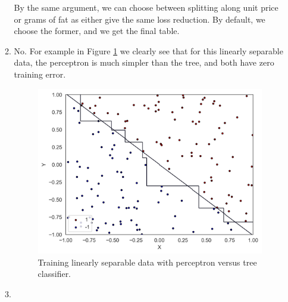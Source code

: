 \documentclass[12pt]{article}
\begin{document}
\begin{enumerate}[leftmargin=*]
\begin{enumerate}[label=\Alph*.]
By the same argument, we can choose between splitting along unit price or grams of fat as either give the same loss reduction. By default, we choose the former, and we get the final table.
\begin{figure}[h!]
\centering
{}
\end{figure}
\item No. For example in Figure \ref{perceptron vs tree} we clearly see that for this linearly separable data, the perceptron is much simpler than the tree, and both have zero training error.
\begin{figure}[h!]
\centering
\includegraphics[scale=0.65]{Set3Figures/random_linear.png}
\caption{Training linearly separable data with perceptron versus tree classifier.} \label{perceptron vs tree}
\end{figure}
\item
\begin{enumerate}

\end{enumerate}
\end{enumerate}
\end{enumerate}
\end{document}
